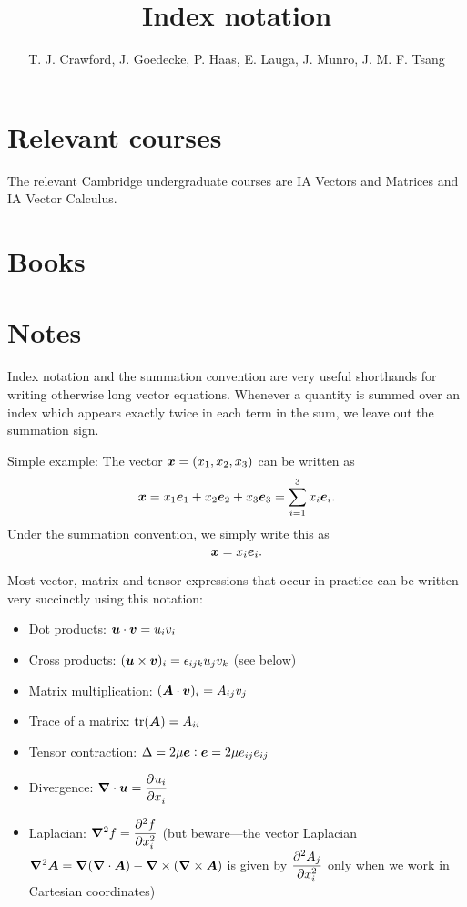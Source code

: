 \documentclass{article}
\title{Index notation}
\author{T. J. Crawford, J. Goedecke, P. Haas, E. Lauga, J. Munro, J. M. F. Tsang}
\begin{document}
\maketitle

\section{Relevant courses}

The relevant Cambridge undergraduate courses are IA Vectors and Matrices and IA
Vector Calculus.

\section{Books}


\section{Notes}

Index notation and the summation convention are very useful shorthands for writing otherwise long vector equations. Whenever a quantity is summed over an index which appears exactly twice in each term in the sum, we leave out the summation sign.

Simple example: The vector $\boldsymbol{x} = (x_1,x_2,x_3)$ can be written as 
$$ \boldsymbol{x} = x_1 \boldsymbol{e}_1 + x_2 \boldsymbol{e}_2 + x_3 \boldsymbol{e}_3 = \sum_{i=1}^3 x_i\boldsymbol{e}_i. $$
Under the summation convention, we simply write this as
$$ \boldsymbol{x} = x_i \boldsymbol{e}_i. $$

Most vector, matrix and tensor expressions that occur in practice can be written
very succinctly using this notation:
\begin{itemize}
    \item Dot products: $ \boldsymbol{u}\cdot\boldsymbol{v} = u_iv_i $
    \item Cross products: $ (\boldsymbol{u}\times\boldsymbol{v})_i = \epsilon_{ijk}u_jv_k $ (see below) 
    \item Matrix multiplication: $(\boldsymbol{A}\cdot\boldsymbol{v})_i = A_{ij}v_j$
    \item Trace of a matrix: $\mathrm{tr}(\boldsymbol{A}) = A_{ii}$
    \item Tensor contraction: $ \Delta = 2\mu\boldsymbol{e}:\boldsymbol{e} = 2\mu e_{ij}e_{ij} $
    \item Divergence: $\divg\bs{u} = \dpd{u_i}{x_i} $
    \item Laplacian: $\grad^2 f = \dpd[2]{f}{x_i} $ (but beware---the vector
    Laplacian $\boldsymbol{\nabla}^2\boldsymbol{A} = \boldsymbol{\nabla}(\boldsymbol{\nabla}\cdot\boldsymbol{A}) - \boldsymbol{\nabla}\times(\boldsymbol{\nabla}\times\boldsymbol{A})$ is given
    by $\dpd[2]{A_j}{x_i}$ only when we work in Cartesian coordinates)
\end{itemize}
\end{document}
